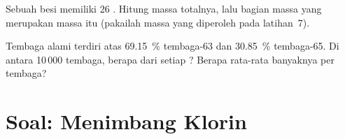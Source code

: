 \begin{exercise}[$\star\star\star$]\label{exo:g9:inside-the-atom:11}
Sebuah  besi memiliki 26 . Hitung massa totalnya, lalu
bagian massa   yang merupakan massa 
itu (pakailah massa yang diperoleh pada latihan~7).
\end{exercise}

\begin{exercise}[$\star\star\star$]\label{exo:g9:inside-the-atom:12}
Tembaga alami terdiri atas \qty{69.15}{\percent} tembaga-63 dan
\qty{30.85}{\percent} tembaga-65. Di antara 10\,000  tembaga, berapa
 dari setiap ? Berapa rata-rata banyaknya  per 
tembaga?
\end{exercise}

\clearpage %
\section{Soal: Menimbang Klorin}

